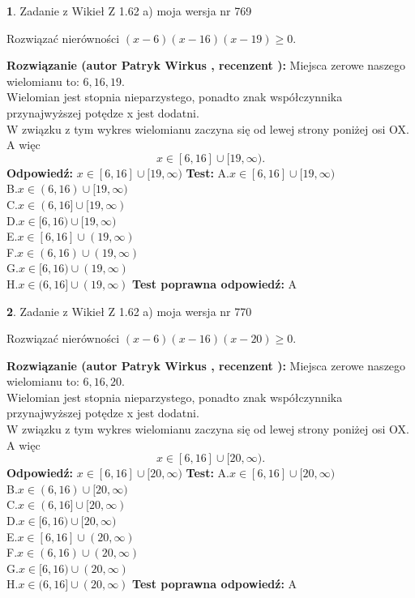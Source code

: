 \documentclass[12pt, a4paper]{article}
\theoremstyle{definition} %
\newtheorem{zad}{}
\newcommand{\zadStart}[1]{\begin{zad}#1\newline}
\newcommand{\zadStop}{\end{zad}}
\newcommand{\rozwStart}[2]{\noindent \textbf{Rozwiązanie (autor #1 , recenzent #2): }\newline}
\newcommand{\rozwStop}{\newline}
\newcommand{\odpStart}{\noindent \textbf{Odpowiedź:}\newline}
\newcommand{\odpStop}{\newline}
\newcommand{\testStart}{\noindent \textbf{Test:}\newline}
\newcommand{\testStop}{\newline}
\newcommand{\kluczStart}{\noindent \textbf{Test poprawna odpowiedź:}\newline}
\newcommand{\kluczStop}{\newline}
\begin{document}
\zadStart{Zadanie z Wikieł Z 1.62 a) moja wersja nr 769}

Rozwiązać nierówności $(x-6)(x-16)(x-19)\ge0$.
\zadStop
\rozwStart{Patryk Wirkus}{}
Miejsca zerowe naszego wielomianu to: $6, 16, 19$.\\
Wielomian jest stopnia nieparzystego, ponadto znak współczynnika przy\linebreak najwyższej potędze x jest dodatni.\\ W związku z tym wykres wielomianu zaczyna się od lewej strony poniżej osi OX. A więc $$x \in [6,16] \cup [19,\infty).$$
\rozwStop
\odpStart
$x \in [6,16] \cup [19,\infty)$
\odpStop
\testStart
A.$x \in [6,16] \cup [19,\infty)$\\
B.$x \in (6,16) \cup [19,\infty)$\\
C.$x \in (6,16] \cup [19,\infty)$\\
D.$x \in [6,16) \cup [19,\infty)$\\
E.$x \in [6,16] \cup (19,\infty)$\\
F.$x \in (6,16) \cup (19,\infty)$\\
G.$x \in [6,16) \cup (19,\infty)$\\
H.$x \in (6,16] \cup (19,\infty)$
\testStop
\kluczStart
A
\kluczStop



\zadStart{Zadanie z Wikieł Z 1.62 a) moja wersja nr 770}

Rozwiązać nierówności $(x-6)(x-16)(x-20)\ge0$.
\zadStop
\rozwStart{Patryk Wirkus}{}
Miejsca zerowe naszego wielomianu to: $6, 16, 20$.\\
Wielomian jest stopnia nieparzystego, ponadto znak współczynnika przy\linebreak najwyższej potędze x jest dodatni.\\ W związku z tym wykres wielomianu zaczyna się od lewej strony poniżej osi OX. A więc $$x \in [6,16] \cup [20,\infty).$$
\rozwStop
\odpStart
$x \in [6,16] \cup [20,\infty)$
\odpStop
\testStart
A.$x \in [6,16] \cup [20,\infty)$\\
B.$x \in (6,16) \cup [20,\infty)$\\
C.$x \in (6,16] \cup [20,\infty)$\\
D.$x \in [6,16) \cup [20,\infty)$\\
E.$x \in [6,16] \cup (20,\infty)$\\
F.$x \in (6,16) \cup (20,\infty)$\\
G.$x \in [6,16) \cup (20,\infty)$\\
H.$x \in (6,16] \cup (20,\infty)$
\testStop
\kluczStart
A
\kluczStop
\end{document}

